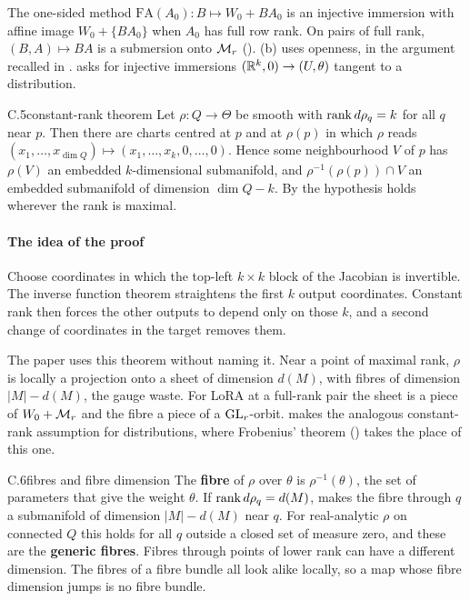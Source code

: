 The one-sided method $\mathrm{FA}(A_0):B\mapsto W_0+BA_0$ is an injective immersion with affine image $W_0+\{BA_0\}$
when $A_0$ has full row rank. On pairs of full rank, $(B,A)\mapsto BA$ is a submersion onto $\mathcal{M}_r$ ().
(b) uses openness, in the argument recalled in .  asks
for injective immersions $(\mathbb{R}^k,0)\to(U,\theta)$ tangent to a distribution.


\begin{bgfact}{C.5}{constant-rank theorem}
Let $\rho:Q\to\Theta$ be smooth with $\operatorname{rank} d\rho_q=k$ for all $q$ near $p$. Then there are charts centred at $p$ and at
$\rho(p)$ in which $\rho$ reads $(x_1,\dots,x_{\dim Q})\mapsto(x_1,\dots,x_k,0,\dots,0)$. Hence some neighbourhood $V$
of $p$ has $\rho(V)$ an embedded $k$-dimensional submanifold, and $\rho^{-1}(\rho(p))\cap V$ an embedded submanifold of
dimension $\dim Q-k$. By  the hypothesis holds wherever the rank is maximal.
\end{bgfact}

\paragraph{The idea of the proof}
Choose coordinates in which the top-left $k\times k$ block of the Jacobian is invertible. The inverse function theorem
straightens the first $k$ output coordinates. Constant rank then forces the other outputs to depend only on those $k$,
and a second change of coordinates in the target removes them.

The paper uses this theorem without naming it. Near a point of maximal rank, $\rho$ is locally a projection onto a sheet
of dimension $d(M)$, with fibres of dimension $\lvert M\rvert-d(M)$, the gauge waste. For LoRA at a full-rank pair the
sheet is a piece of $W_0+\mathcal{M}_r$ and the fibre a piece of a $\mathrm{GL}_r$-orbit.  makes the analogous
constant-rank assumption for distributions, where Frobenius' theorem () takes the place of this one.


\begin{bgentry}{C.6}{fibres and fibre dimension}
The \textbf{fibre} of $\rho$ over $\theta$ is $\rho^{-1}(\theta)$, the set of parameters that give the weight $\theta$.
If $\operatorname{rank} d\rho_q=d(M)$,  makes the fibre through $q$ a submanifold of dimension $\lvert M\rvert-d(M)$ near
$q$. For real-analytic $\rho$ on connected $Q$ this holds for all $q$ outside a closed set of measure zero, and these
are the \textbf{generic fibres}. Fibres through points of lower rank can have a different dimension. The fibres of a
fibre bundle all look alike locally, so a map whose fibre dimension jumps is no fibre bundle.
\end{bgentry}

